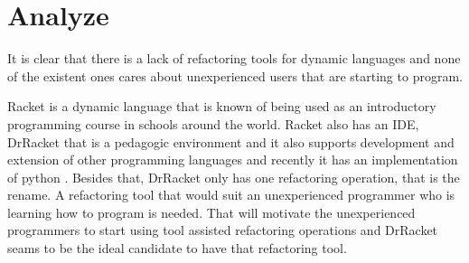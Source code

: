 \section{Analyze}

It is clear that there is a lack of refactoring tools for dynamic languages and none of the existent ones cares about unexperienced users that are starting to program.

Racket is a dynamic language that is known of being used as an introductory programming course in schools around the world. 
Racket also has an IDE, DrRacket that is a pedagogic environment \cite{drscheme_pegadogy} and it also supports development and extension of other programming languages \cite{tobin2011languages} and recently it has an implementation of python \cite{ramos2014implementation}.
Besides that, DrRacket only has one refactoring operation, that is the rename.
A refactoring tool that would suit an unexperienced programmer who is learning how to program is needed. 
That will motivate the unexperienced programmers to start using tool assisted refactoring operations and DrRacket seams to be the ideal candidate to have that refactoring tool.


